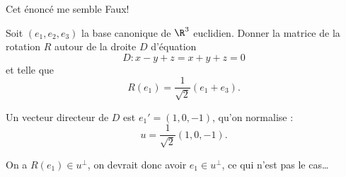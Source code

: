 \begin{enonce}
\begin{exercise}[ID={RMS135 E1434},subtitle={IMT MP 2024},tags={},difficulty={}]
Cet énoncé me semble Faux!


Soit $(e_1, e_2, e_3)$ la base canonique de $\R^3$ euclidien.
Donner la matrice de la rotation $R$ autour de la droite $D$ d’équation 
\begin{equation*}
  D: x - y + z = x + y + z = 0
  \end{equation*}
et telle que
\begin{equation*}
R(e_1) = \frac{1}{\sqrt{2}}(e_1 + e_3).
  \end{equation*}
\end{exercise}
\begin{solution}
  Un vecteur directeur de $D$ est $e_1' = (1, 0, -1)$, qu’on normalise :
  \[ u = \frac{1}{\sqrt{2}}(1, 0, -1).  \]

  On a $R(e_1)\in u^\perp$, on devrait donc avoir $e_1 \in u^\perp$, ce qui n'est pas le cas\dots
\end{solution}
\end{enonce}
